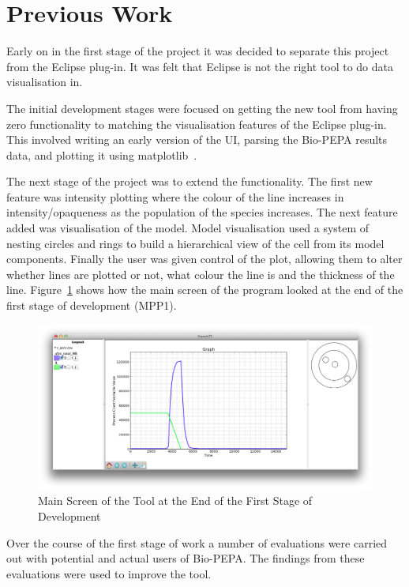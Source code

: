 \section{Previous Work}

Early on in the first stage of the project it was decided to separate this project from the Eclipse plug-in.  It was felt that Eclipse is not the right tool to do data visualisation in.

The initial development stages were focused on getting the new tool from having zero functionality to matching the visualisation features of the Eclipse plug-in.  This involved writing an early version of the \ac{UI}, parsing the Bio-PEPA results data, and plotting it using matplotlib~\cite{mpl}.

The next stage of the project was to extend the functionality.  The first new feature was intensity plotting where the colour of the line increases in intensity/opaqueness as the population of the species increases.  The next feature added was visualisation of the model.  Model visualisation used a system of nesting circles and rings to build a hierarchical view of the cell from its model components.  Finally the user was given control of the plot, allowing them to alter whether lines are plotted or not, what colour the line is and the thickness of the line.  Figure~\ref{fig:f75_mac_intro} shows how the main screen of the program looked at the end of the first stage of development (MPP1).

\begin{figure}[h!]
    \centering
    \includegraphics[width=\textwidth]{images/french75_mac.png}
    \caption{Main Screen of the Tool at the End of the First Stage of Development}
    \label{fig:f75_mac_intro}
\end{figure}

Over the course of the first stage of work a number of evaluations were carried out with potential and actual users of Bio-PEPA.  The findings from these evaluations were used to improve the tool.

